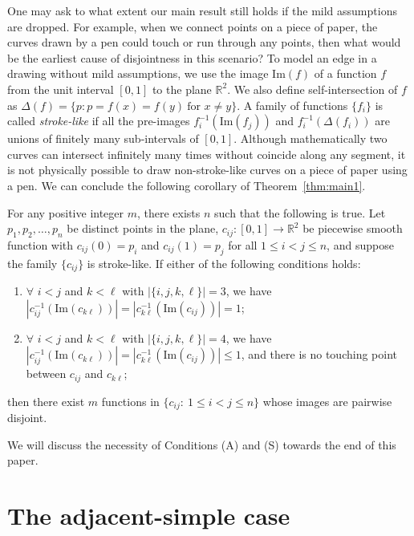 \documentclass[a4paper,UKenglish,cleveref, autoref, thm-restate]{lipics_arxiv}
\begin{document}
One may ask to what extent our main result still holds if the mild assumptions are dropped. For example, when we connect points on a piece of paper, the curves drawn by a pen could touch or run through any points, then what would be the earliest cause of disjointness in this scenario? To model an edge in a drawing without mild assumptions, we use the image $\text{Im}(f)$ of a function $f$ from the unit interval $[0,1]$ to the plane $\mathbb{R}^2$. We also define self-intersection of $f$ as $\Delta(f)=\{p: p=f(x)=f(y)~\text{for $x\neq y$}\}$. A family of functions $\{f_i\}$ is called \textit{stroke-like} if all the pre-images $f_i^{-1}(\text{Im}(f_j))$ and $f_i^{-1}(\Delta(f_i))$ are unions of finitely many sub-intervals of $[0,1]$. Although mathematically two curves can intersect infinitely many times without coincide along any segment, it is not physically possible to draw non-stroke-like curves on a piece of paper using a pen. We can conclude the following corollary of Theorem~\ref{thm:main1}.
\begin{corollary}\label{cor:main0}
    For any positive integer $m$, there exists $n$ such that the following is true. Let $p_1,p_2,\dots,p_n$ be distinct points in the plane, $c_{ij}: [0,1] \to \mathbb{R}^2$ be piecewise smooth function with $c_{ij}(0)=p_i$ and $c_{ij}(1)=p_j$ for all $1\leq i<j \leq n$, and suppose the family $\{c_{ij}\}$ is stroke-like. If either of the following conditions holds: \begin{enumerate}
        \item[(A)] $\forall$ $i<j$ and $k<\ell$ with $|\{i,j,k,\ell\}| = 3$, we have $|c_{ij}^{-1}(\text{Im}(c_{k\ell}))| = |c_{k\ell}^{-1}(\text{Im}(c_{ij}))| = 1$;
        \item[(S)] $\forall$ $i<j$ and $k<\ell$ with $|\{i,j,k,\ell\}| = 4$, we have $|c_{ij}^{-1}(\text{Im}(c_{k\ell}))| = |c_{k\ell}^{-1}(\text{Im}(c_{ij}))| \leq 1$, and there is no touching point between $c_{ij}$ and $c_{k\ell}$;
    \end{enumerate} then there exist $m$ functions in $\{c_{ij}:~1\leq i<j \leq n\}$ whose images are pairwise disjoint.
\end{corollary}

We will discuss the necessity of Conditions (A) and (S) towards the end of this paper.

\section{The adjacent-simple case}\label{sec:adjacent}
\end{document}
